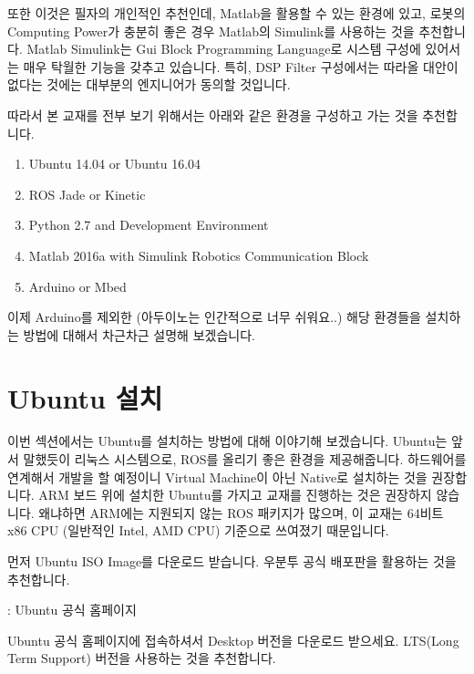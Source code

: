 \documentclass[11pt,fleqn]{book} %
\begin{document}
또한 이것은 필자의 개인적인 추천인데, Matlab을 활용할 수 있는 환경에 있고, 로봇의 Computing Power가 충분히 좋은 경우 Matlab의 Simulink를 사용하는 것을 추천합니다.
Matlab Simulink는 Gui Block Programming Language로 시스템 구성에 있어서는 매우 탁월한 기능을 갖추고 있습니다.
특히, DSP Filter 구성에서는 따라올 대안이 없다는 것에는 대부분의 엔지니어가 동의할 것입니다.

따라서 본 교재를 전부 보기 위해서는 아래와 같은 환경을 구성하고 가는 것을 추천합니다.

\begin{enumerate}
\item Ubuntu 14.04 or Ubuntu 16.04
\item ROS Jade or Kinetic
\item Python 2.7 and Development Environment
\item Matlab 2016a with Simulink Robotics Communication Block
\item Arduino or Mbed
\end{enumerate}

이제 Arduino를 제외한 (아두이노는 인간적으로 너무 쉬워요..) 해당 환경들을 설치하는 방법에 대해서 차근차근 설명해 보겠습니다.


\section{Ubuntu 설치}
\label{sec:Ubuntu 설치}

이번 섹션에서는 Ubuntu를 설치하는 방법에 대해 이야기해 보겠습니다. Ubuntu는 앞서 말했듯이 리눅스 시스템으로,
ROS를 올리기 좋은 환경을 제공해줍니다. 하드웨어를 연계해서 개발을 할 예정이니 Virtual Machine이 아닌 Native로 설치하는 것을 권장합니다.
ARM 보드 위에 설치한 Ubuntu를 가지고 교재를 진행하는 것은 권장하지 않습니다. 왜냐하면 ARM에는 지원되지 않는 ROS 패키지가 많으며, 이 교재는 64비트 x86 CPU (일반적인 Intel, AMD CPU) 기준으로 쓰여졌기 때문입니다.

먼저 Ubuntu ISO Image를 다운로드 받습니다. 우분투 공식 배포판을 활용하는 것을 추천합니다.

\begin{link}
  : Ubuntu 공식 홈페이지
\end{link}

 Ubuntu 공식 홈페이지에 접속하셔서 Desktop 버전을 다운로드 받으세요. LTS(Long Term Support) 버전을 사용하는 것을 추천합니다.
\end{document}
